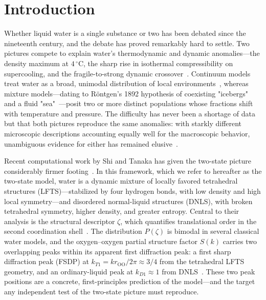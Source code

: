 \documentclass[aps, amsmath,amssymb, reprint, twocolumn, superscriptaddress]{revtex4-2}
\begin{document}

\section{Introduction}

Whether liquid water is a single substance or two has been debated since the nineteenth century, and the debate has proved remarkably hard to settle. Two pictures compete to explain water's thermodynamic and dynamic anomalies---the density maximum at $4\,^\circ$C, the sharp rise in isothermal compressibility on supercooling, and the fragile-to-strong
dynamic crossover~\cite{gallo_water_2016}. Continuum models treat water as a broad, unimodal distribution of local environments~\cite{narten_observed_1969, eisenberg_structure_2005}, whereas mixture models---dating to R\"{o}ntgen's
1892 hypothesis of coexisting "icebergs" and a fluid "sea"~\cite{rontgen-1892}---posit two or more distinct populations whose fractions shift with temperature and pressure. The difficulty has never been a shortage of data but that both
pictures reproduce the same anomalies: with starkly different microscopic descriptions accounting equally well for the macroscopic behavior, unambiguous evidence for either has remained elusive~\cite{narten_observed_1969,
eisenberg_structure_2005,handle_supercooled_2017}.

Recent computational work by Shi and Tanaka has given the two-state picture considerably firmer footing~\cite{shi_direct_2020,russo_understanding_2014,shi_microscopic_2018}. In this framework, which we refer to hereafter as the two-state model, water is a dynamic mixture of locally favored tetrahedral structures (LFTS)---stabilized by four hydrogen bonds, with low density and high local symmetry---and disordered normal-liquid structures (DNLS), with broken tetrahedral symmetry, higher density, and greater entropy. Central to their analysis is the
structural descriptor $\zeta$, which quantifies translational order in the second coordination shell~\cite{russo_understanding_2014}. The distribution $P(\zeta)$ is bimodal in several classical water models, and the
oxygen--oxygen partial structure factor $S(k)$ carries two overlapping peaks within its apparent first diffraction peak: a first sharp diffraction peak (FSDP) at $k_{T1} = k r_{\mathrm{OO}}/2\pi \approx 3/4$ from the tetrahedral
LFTS geometry, and an ordinary-liquid peak at $k_{D1} \approx 1$ from DNLS~\cite{shi_direct_2020,shi-2019}. These two peak positions are a concrete, first-principles prediction of the model---and the target any independent
test of the two-state picture must reproduce.
\end{document}
